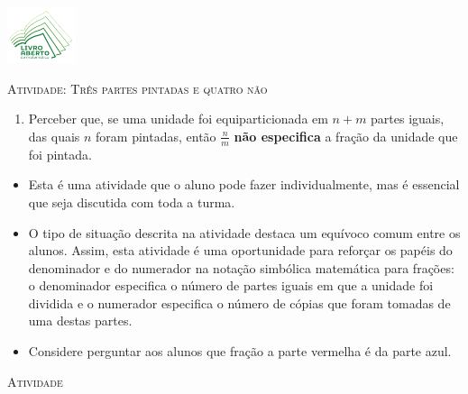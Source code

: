 \documentclass[10 pt,usenames,dvipsnames, oneside]{article}
\begin{document}
\begin{center}
  \begin{minipage}[l]{3cm}
\includegraphics[width=2cm]{../../../Figuras/logo}       
\end{minipage}\hfill
\begin{minipage}[r]{.8\textwidth}
 {\Large \scshape Atividade: Três partes pintadas e quatro não}  
\end{minipage}
\end{center}
\vspace{.2cm}

\ifdefined\prof
\begin{goals}
\begin{enumerate}

    \item Perceber que, se uma unidade foi equiparticionada em $n + m$ partes iguais, das quais $n$ foram pintadas, então $\frac{n}{m}$ {\bf não especifica} a fração da unidade que foi pintada.

\end{enumerate}
\tcblower

\begin{itemize} %
    \item       Esta é uma atividade que o aluno pode fazer individualmente, mas é essencial que seja discutida com toda a turma.
    \item       O tipo de situação descrita na atividade destaca um equívoco comum entre os alunos. Assim, esta atividade é uma oportunidade para reforçar os papéis do denominador e do numerador na notação simbólica matemática para frações: o denominador especifica o número de partes iguais em que a unidade foi dividida e o numerador especifica o número de cópias que foram tomadas de uma destas partes.
      \item Considere perguntar aos alunos que fração a parte vermelha é da parte azul.

\end{itemize} %

\end{goals}

\bigskip
\begin{center}
{\large \scshape Atividade}
\end{center}
\fi
\end{document}
